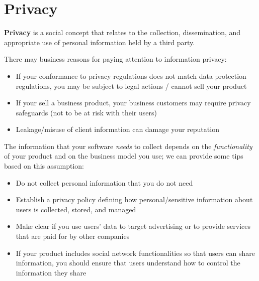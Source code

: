 \section{Privacy}
\textbf{Privacy} is a social concept that relates to the collection,
dissemination, and appropriate use of personal information held
by a third party.

There may business reasons for paying attention to information privacy:
\begin{itemize}
   \item If your conformance to privacy regulations does not match data
   protection regulations, you may be subject to legal actions / cannot sell
   your product
   \item If your sell a business product, your business customers may require privacy safeguards (not to be at risk with their users)
   \item Leakage/misuse of client information can damage your reputation
\end{itemize}

The information that your software \textit{needs} to collect depends on the
\textit{functionality} of your product and on the business model you use;
we can provide some tips based on this assumption:
\begin{itemize}
   \item Do not collect personal information that you do not need
   \item Establish a privacy policy defining how personal/sensitive information about
   users is collected, stored, and managed
   \item Make clear if you use users’ data to target advertising or to provide services that are paid for by other companies
   \item If your product includes social network functionalities so that users can share
   information, you should ensure that users understand how to control the
   information they share
\end{itemize}